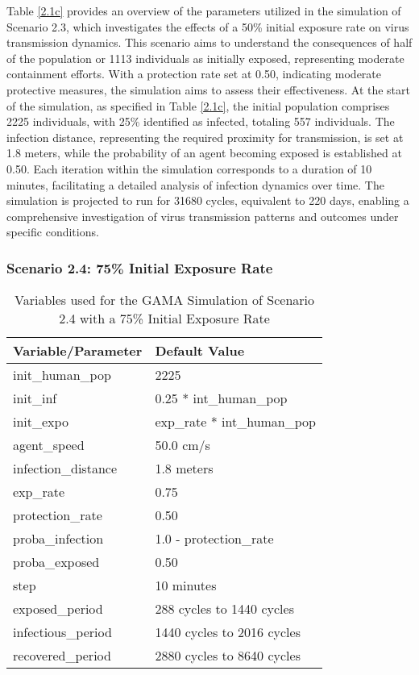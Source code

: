 Table \ref{2.1c} provides an overview of the parameters utilized in the simulation of Scenario 2.3, which investigates the effects of a 50\% initial exposure rate on virus transmission dynamics. This scenario aims to understand the consequences of half of the population or 1113 individuals as initially exposed, representing moderate containment efforts. With a protection rate set at 0.50, indicating moderate protective measures, the simulation aims to assess their effectiveness. At the start of the simulation, as specified in Table \ref{2.1c}, the initial population comprises 2225 individuals, with 25\% identified as infected, totaling 557 individuals. The infection distance, representing the required proximity for transmission, is set at 1.8 meters, while the probability of an agent becoming exposed is established at 0.50. Each iteration within the simulation corresponds to a duration of 10 minutes, facilitating a detailed analysis of infection dynamics over time. The simulation is projected to run for 31680 cycles, equivalent to 220 days, enabling a comprehensive investigation of virus transmission patterns and outcomes under specific conditions.


\subsubsection{Scenario 2.4: 75\% Initial Exposure Rate}
\begin{table}[H]
	\centering
	\begin{tabular}{ll}
		\toprule
		\textbf{Variable/Parameter} & \textbf{Default Value}\\
		\hline
		init\_human\_pop & 2225\\
		init\_inf & 0.25 * int\_human\_pop\\
		init\_expo & exp\_rate * int\_human\_pop \\
		agent\_speed & 50.0 cm/s\\
		infection\_distance & 1.8 meters\\
		exp\_rate & 0.75\\
		protection\_rate & 0.50\\
		proba\_infection & 1.0 - protection\_rate\\
		proba\_exposed & 0.50\\
		step & 10 minutes\\
		exposed\_period & 288 cycles to 1440 cycles\\
		infectious\_period & 1440 cycles to 2016 cycles\\
		recovered\_period & 2880 cycles to 8640 cycles\\ 
		\bottomrule
	\end{tabular}
	\caption{Variables used for the GAMA Simulation of Scenario 2.4 with a 75\% Initial Exposure Rate}
	\label{2.1d}
\end{table}


